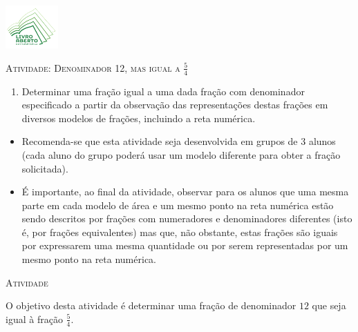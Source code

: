 \documentclass[10 pt,usenames,dvipsnames, oneside]{article}
\begin{document}
\begin{center}
  \begin{minipage}[l]{3cm}
\includegraphics[width=2cm]{../../../Figuras/logo}       
\end{minipage}\hfill
\begin{minipage}[r]{.8\textwidth}
 {\Large \scshape Atividade: Denominador 12, mas igual a $\frac{5}{4}$}  
\end{minipage}
\end{center}
\vspace{.2cm}

\ifdefined\prof
\begin{goals}
\begin{enumerate}
\item       Determinar uma fração igual a uma dada fração com denominador
especificado a partir da observação das representações destas frações em
diversos modelos de frações, incluindo a reta numérica.
\end{enumerate}

\tcblower

\begin{itemize}
\item       Recomenda-se que esta atividade seja desenvolvida em grupos de 3
alunos (cada aluno do grupo poderá usar um modelo diferente para obter a fração
solicitada).
    \item       É importante, ao final da atividade, observar para os alunos que
uma mesma parte em cada modelo de área e um mesmo ponto na reta numérica estão
sendo descritos por frações com numeradores e denominadores diferentes (isto é,
por frações equivalentes) mas que, não obstante, estas frações são iguais por
expressarem uma mesma quantidade ou por serem representadas por um mesmo ponto
na reta numérica.
\end{itemize}
\end{goals}

\bigskip
\begin{center}
{\large \scshape Atividade}
\end{center}
\fi

O objetivo desta atividade é determinar uma fração de denominador $12$ que seja igual à fração $\frac{5}{4}$.
\end{document}
